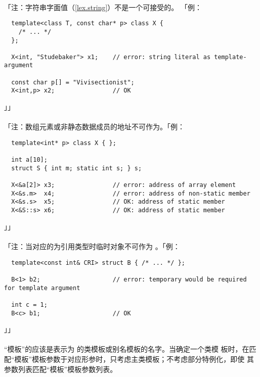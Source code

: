 \paragraph{}
「注：字符串字面值（\ref{lex.string}）不是一个可接受的。
「例：
\begin{lstlisting}
  template<class T, const char* p> class X {
    /* ... */
  };

  X<int, "Studebaker"> x1;    // error: string literal as template-argument

  const char p[] = "Vivisectionist";
  X<int,p> x2;                // OK
\end{lstlisting}」」

\paragraph{}
「注：数组元素或非静态数据成员的地址不可作为。「例：
\begin{lstlisting}
  template<int* p> class X { };

  int a[10];
  struct S { int m; static int s; } s;

  X<&a[2]> x3;                // error: address of array element
  X<&s.m>  x4;                // error: address of non-static member
  X<&s.s>  x5;                // OK: address of static member
  X<&S::s> x6;                // OK: address of static member
\end{lstlisting}」」

\paragraph{}
「注：当对应的为引用类型时临时对象不可作为
。「例：
\begin{lstlisting}
  template<const int& CRI> struct B { /* ... */ };

  B<1> b2;                    // error: temporary would be required for template argument

  int c = 1;
  B<c> b1;                    // OK
\end{lstlisting}」」

\paragraph{}
``模板''的应该是表示为
的类模板或别名模板的名字。当确定一个类模
板时，在匹配``模板''模板参数于对应形参时，只考虑主类模板；不考虑部分特例化，即使
其参数列表匹配``模板''模板参数列表。

